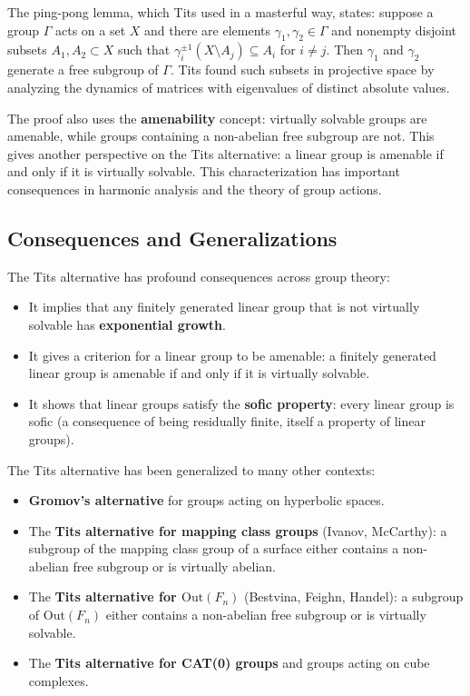 The ping-pong lemma, which Tits used in a masterful way, states: suppose a group \(\Gamma\) acts on a set \(X\) and there are elements \(\gamma_1, \gamma_2 \in \Gamma\) and nonempty disjoint subsets \(A_1, A_2 \subset X\) such that \(\gamma_i^{\pm 1}(X \setminus A_j) \subseteq A_i\) for \(i \neq j\). Then \(\gamma_1\) and \(\gamma_2\) generate a free subgroup of \(\Gamma\). Tits found such subsets in projective space by analyzing the dynamics of matrices with eigenvalues of distinct absolute values.

The proof also uses the \textbf{amenability} concept: virtually solvable groups are amenable, while groups containing a non-abelian free subgroup are not. This gives another perspective on the Tits alternative: a linear group is amenable if and only if it is virtually solvable. This characterization has important consequences in harmonic analysis and the theory of group actions.

\subsection{Consequences and Generalizations}

The Tits alternative has profound consequences across group theory:
\begin{itemize}
    \item It implies that any finitely generated linear group that is not virtually solvable has \textbf{exponential growth}.
    \item It gives a criterion for a linear group to be amenable: a finitely generated linear group is amenable if and only if it is virtually solvable.
    \item It shows that linear groups satisfy the \textbf{sofic property}: every linear group is sofic (a consequence of being residually finite, itself a property of linear groups).
\end{itemize}

The Tits alternative has been generalized to many other contexts:
\begin{itemize}
    \item \textbf{Gromov's alternative} for groups acting on hyperbolic spaces.
    \item The \textbf{Tits alternative for mapping class groups} (Ivanov, McCarthy): a subgroup of the mapping class group of a surface either contains a non-abelian free subgroup or is virtually abelian.
    \item The \textbf{Tits alternative for \(\text{Out}(F_n)\)} (Bestvina, Feighn, Handel): a subgroup of \(\text{Out}(F_n)\) either contains a non-abelian free subgroup or is virtually solvable.
    \item The \textbf{Tits alternative for CAT(0) groups} and groups acting on cube complexes.
\end{itemize}


